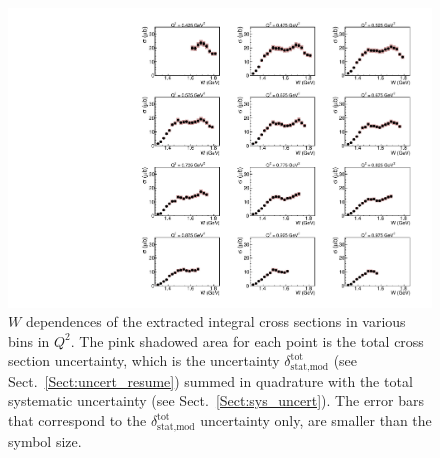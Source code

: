\begin{figure}[htp]
\begin{center}
\includegraphics[width=\textwidth]{pictures/conclusion/wdep_20Jul2021.pdf}
\caption{\small $W$ dependences of the extracted integral cross sections in various bins in $Q^{2}$. The pink shadowed area for each point is the total cross section uncertainty, which is the uncertainty $\delta_{\text{stat,mod}}^{\text{tot}}$ (see Sect.~\ref{Sect:uncert_resume}) summed in quadrature with the total systematic uncertainty (see Sect.~\ref{Sect:sys_uncert}). The error bars that correspond to the $\delta_{\text{stat,mod}}^{\text{tot}}$ uncertainty only, are smaller than the symbol size.   } \label{fig:int_w_dep}
\end{center}
\end{figure}


